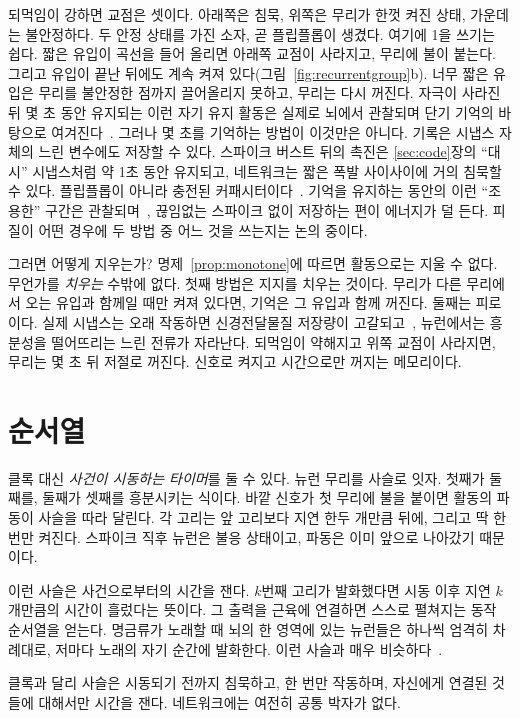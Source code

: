 되먹임이 강하면 교점은 셋이다. 아래쪽은 침묵, 위쪽은 무리가 한껏 켜진 상태, 가운데는 불안정하다. 두 안정 상태를 가진 소자, 곧 플립플롭이 생겼다. 여기에 1을 쓰기는 쉽다. 짧은 유입이 곡선을 들어 올리면 아래쪽 교점이 사라지고, 무리에 불이 붙는다. 그리고 유입이 끝난 뒤에도 계속 켜져 있다(그림~\ref{fig:recurrentgroup}b). 너무 짧은 유입은 무리를 불안정한 점까지 끌어올리지 못하고, 무리는 다시 꺼진다. 자극이 사라진 뒤 몇 초 동안 유지되는 이런 자기 유지 활동은 실제로 뇌에서 관찰되며 단기 기억의 바탕으로 여겨진다~\cite{Wang2001}. 그러나 몇 초를 기억하는 방법이 이것만은 아니다. 기록은 시냅스 자체의 느린 변수에도 저장할 수 있다. 스파이크 버스트 뒤의 촉진은 \ref{sec:code}장의 “대시” 시냅스처럼 약 1초 동안 유지되고, 네트워크는 짧은 폭발 사이사이에 거의 침묵할 수 있다. 플립플롭이 아니라 충전된 커패시터이다~\cite{Mongillo2008}. 기억을 유지하는 동안의 이런 “조용한” 구간은 관찰되며~\cite{Stokes2015}, 끊임없는 스파이크 없이 저장하는 편이 에너지가 덜 든다. 피질이 어떤 경우에 두 방법 중 어느 것을 쓰는지는 논의 중이다.

그러면 어떻게 지우는가? 명제~\ref{prop:monotone}에 따르면 활동으로는 지울 수 없다. 무언가를 \emph{치우는} 수밖에 없다. 첫째 방법은 지지를 치우는 것이다. 무리가 다른 무리에서 오는 유입과 함께일 때만 켜져 있다면, 기억은 그 유입과 함께 꺼진다. 둘째는 피로이다. 실제 시냅스는 오래 작동하면 신경전달물질 저장량이 고갈되고~\cite{Tsodyks1997}, 뉴런에서는 흥분성을 떨어뜨리는 느린 전류가 자라난다. 되먹임이 약해지고 위쪽 교점이 사라지면, 무리는 몇 초 뒤 저절로 꺼진다. 신호로 켜지고 시간으로만 꺼지는 메모리이다.

\section{순서열}

클록 대신 \emph{사건이 시동하는 타이머}를 둘 수 있다.  뉴런 무리를 사슬로 잇자. 첫째가 둘째를, 둘째가 셋째를 흥분시키는 식이다. 바깥 신호가 첫 무리에 불을 붙이면 활동의 파동이 사슬을 따라 달린다. 각 고리는 앞 고리보다 지연 한두 개만큼 뒤에, 그리고 딱 한 번만 켜진다. 스파이크 직후 뉴런은 불응 상태이고, 파동은 이미 앞으로 나아갔기 때문이다.

이런 사슬은 사건으로부터의 시간을 잰다. $k$번째 고리가 발화했다면 시동 이후 지연 $k$개만큼의 시간이 흘렀다는 뜻이다. 그 출력을 근육에 연결하면 스스로 펼쳐지는 동작 순서열을 얻는다. 명금류가 노래할 때 뇌의 한 영역에 있는  뉴런들은 하나씩 엄격히 차례대로, 저마다 노래의 자기 순간에 발화한다. 이런 사슬과 매우 비슷하다~\cite{Hahnloser2002}.

클록과 달리 사슬은 시동되기 전까지 침묵하고, 한 번만 작동하며, 자신에게 연결된 것들에 대해서만 시간을 잰다. 네트워크에는 여전히 공통 박자가 없다.

